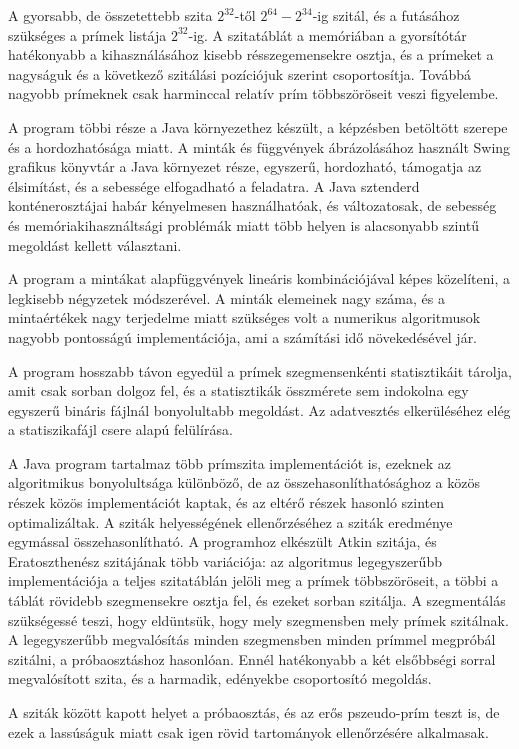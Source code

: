 \documentclass[12pt]{report}
\begin{document}
A gyorsabb, de összetettebb szita $2^{32}$-től $2^{64}-2^{34}$-ig szitál,
és a futásához szükséges a prímek listája $2^{32}$-ig.
A szitatáblát a memóriában a gyorsítótár hatékonyabb a kihasználásához kisebb
résszegemensekre osztja,
és a prímeket a nagyságuk és a következő szitálási pozíciójuk szerint csoportosítja.
Továbbá nagyobb prímeknek csak harminccal relatív prím többszöröseit veszi figyelembe.

A program többi része a Java környezethez készült, a képzésben betöltött szerepe és
a hordozhatósága miatt.
A minták és függvények ábrázolásához használt Swing grafikus könyvtár
a Java környezet része, egyszerű, hordozható, támogatja az élsimítást,
és a sebessége elfogadható a feladatra.
A Java sztenderd konténerosztájai habár kényelmesen használhatóak, és változatosak,
de sebesség és memóriakihasználtsági problémák miatt több helyen is alacsonyabb szintű
megoldást kellett választani.

A program a mintákat alapfüggvények lineáris kombinációjával képes közelíteni,
a legkisebb négyzetek módszerével. A minták elemeinek nagy száma, és a mintaértékek
nagy terjedelme miatt szükséges volt a numerikus algoritmusok nagyobb pontosságú
implementációja, ami a számítási idő növekedésével jár.

A program hosszabb távon egyedül a prímek szegmensenkénti statisztikáit tárolja,
amit csak sorban dolgoz fel, és a statisztikák összmérete sem indokolna
egy egyszerű bináris fájlnál bonyolultabb megoldást. Az adatvesztés elkerüléséhez
elég a statiszikafájl csere alapú felülírása.

A Java program tartalmaz több prímszita implementációt is, ezeknek az algoritmikus
bonyolultsága különböző, de az összehasonlíthatósághoz a közös részek közös
implementációt kaptak, és az eltérő részek hasonló szinten optimalizáltak.
A sziták helyességének ellenőrzéséhez a sziták eredménye egymással összehasonlítható.
A programhoz elkészült Atkin szitája, és Eratoszthenész szitájának több variációja:
az algoritmus legegyszerűbb implementációja a teljes szitatáblán jelöli meg
a prímek többszöröseit, a többi a táblát rövidebb szegmensekre osztja fel,
és ezeket sorban szitálja. A szegmentálás szükségessé teszi, hogy eldüntsük,
hogy mely szegmensben mely prímek szitálnak. A legegyszerűbb megvalósítás
minden szegmensben minden prímmel megpróbál szitálni, a próbaosztáshoz hasonlóan.
Ennél hatékonyabb a két elsőbbségi sorral megvalósított szita, és a harmadik,
edényekbe csoportosító megoldás.

A sziták között kapott helyet a próbaosztás, és az erős pszeudo-prím teszt is,
de ezek a lassúságuk miatt csak igen rövid tartományok ellenőrzésére alkalmasak.
\end{document}

